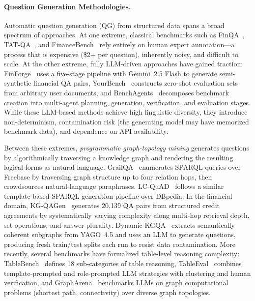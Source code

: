 \documentclass[11pt]{article}
\begin{document}
\paragraph{Question Generation Methodologies.}
Automatic question generation (QG) from structured data spans a broad
spectrum of approaches.  At one extreme, classical benchmarks such as
FinQA~\citep{chen2021finqa}, TAT-QA~\citep{zhu2021tat}, and
FinanceBench~\citep{islam2023financebench} rely entirely on human expert
annotation---a process that is expensive (\$2+ per question), inherently
noisy, and difficult to scale.  At the other extreme, fully
LLM-driven approaches have gained traction: FinForge~\citep{matlin2026finforge}
uses a five-stage pipeline with Gemini~2.5 Flash to generate
semi-synthetic financial QA pairs, YourBench~\citep{shashidhar2025yourbench}
constructs zero-shot evaluation sets from arbitrary user documents, and
BenchAgents~\citep{butt2024benchagents} decomposes benchmark creation
into multi-agent planning, generation, verification, and evaluation stages.
While these LLM-based methods achieve high linguistic diversity, they
introduce non-determinism, contamination risk (the generating model may
have memorized benchmark data), and dependence on API availability.

Between these extremes, \emph{programmatic graph-topology mining}
generates questions by algorithmically traversing a knowledge graph
and rendering the resulting logical forms as natural language.
GrailQA~\citep{gu2021grailqa} enumerates SPARQL queries over Freebase by
traversing graph structure up to four relation hops, then crowdsources
natural-language paraphrases.
LC-QuAD~\citep{trivedi2017lcquad} follows a similar template-based SPARQL
generation pipeline over DBpedia.
In the financial domain,
KG-QAGen~\citep{tatarinov2025kgqagen} generates 20{,}139 QA pairs from
structured credit agreements by systematically varying complexity along
multi-hop retrieval depth, set operations, and answer plurality.
Dynamic-KGQA~\citep{dammu2025dynamickgqa} extracts semantically coherent
subgraphs from YAGO~4.5 and uses an LLM to generate questions, producing
fresh train/test splits each run to resist data contamination.
More recently, several benchmarks have formalized table-level reasoning
complexity: TableBench~\citep{wu2025tablebench} defines 18 sub-categories
of table reasoning,
TableEval~\citep{zhu2025tableeval} combines template-prompted and
role-prompted LLM strategies with clustering and human verification, and
GraphArena~\citep{tang2025grapharena} benchmarks LLMs on graph
computational problems (shortest path, connectivity) over diverse graph
topologies.
\end{document}
